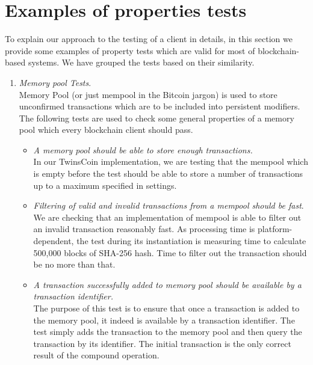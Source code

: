 
\section{Examples of properties tests}
\label{sec:examples}

To explain our approach to the testing of a client in details, in this section we provide some examples of property tests which are valid for most of blockchain-based systems. We have grouped the tests based on their similarity.

\begin{enumerate}[\IEEEsetlabelwidth{Z}]
\item \textit{Memory pool Tests}.\\

Memory Pool (or just mempool in the Bitcoin jargon) is used to store unconfirmed transactions which are to be included into persistent modifiers. The following tests are used to check some general properties of a memory pool which every blockchain client should pass.

\begin{itemize}[]

\item \textit{A memory pool should be able to store enough transactions.}\\
In our TwinsCoin implementation, we are testing that the mempool which is empty before the test should be able to store a number of transactions up to a maximum specified in settings.

\item \textit{Filtering of valid and invalid transactions from a mempool should be fast}.\\
We are checking that an implementation of mempool is able to filter out an invalid transaction reasonably fast. As processing time is platform-dependent, the test during its instantiation is measuring time to calculate 500,000 blocks of SHA-256 hash. Time to filter out the transaction should be no more than that. 

\item \textit{A transaction successfully added to memory pool should be available by a transaction identifier.}\\
The purpose of this test is to ensure that once a transaction is added to the memory pool, it indeed is available by a transaction identifier. The test simply adds the transaction to the memory pool and then query the transaction by its identifier. The initial transaction is the only correct result of the compound operation. 


\end{itemize}
\end{enumerate}
